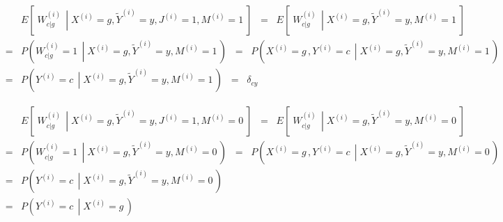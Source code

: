 \begin{eqnarray*}
&&
	E\!\left[\;\left.W^{(i)}_{c \vert g}\,\;\right\vert\;X^{(i)}=g,\widetilde{Y}^{(i)}=y,J^{(i)}=1,M^{(i)}=1\;\right]
\;\;=\;\;
	E\!\left[\;\left.W^{(i)}_{c \vert g}\,\;\right\vert\;X^{(i)}=g,\widetilde{Y}^{(i)}=y,M^{(i)}=1\;\right]
\\
&=&
	P\!\left(\left.W^{(i)}_{c \vert g}=1\,\;\right\vert\;X^{(i)}=g,\widetilde{Y}^{(i)}=y,M^{(i)}=1\,\right)
\;\;=\;\;
	P\!\left(\left.X^{(i)} = g\,,Y^{(i)} = c\,\;\right\vert\;X^{(i)}=g,\widetilde{Y}^{(i)}=y,M^{(i)}=1\,\right)
\\
&=&
	P\!\left(\left.Y^{(i)} = c\,\;\right\vert\;X^{(i)}=g,\widetilde{Y}^{(i)}=y,M^{(i)}=1\,\right)
	\;\; = \;\; \delta_{cy}
\end{eqnarray*}

\begin{eqnarray*}
&&
	E\!\left[\;\left.W^{(i)}_{c \vert g}\,\;\right\vert\;X^{(i)}=g,\widetilde{Y}^{(i)}=y,J^{(i)}=1,M^{(i)}=0\;\right]
\;\;=\;\;
	E\!\left[\;\left.W^{(i)}_{c \vert g}\,\;\right\vert\;X^{(i)}=g,\widetilde{Y}^{(i)}=y,M^{(i)}=0\;\right]
\\
&=&
	P\!\left(\left.W^{(i)}_{c \vert g}=1\,\;\right\vert\;X^{(i)}=g,\widetilde{Y}^{(i)}=y,M^{(i)}=0\,\right)
\;\;=\;\;
	P\!\left(\left.X^{(i)} = g\,,Y^{(i)} = c\,\;\right\vert\;X^{(i)}=g,\widetilde{Y}^{(i)}=y,M^{(i)}=0\,\right)
\\
&=&
	P\!\left(\left.Y^{(i)} = c\,\;\right\vert\;X^{(i)}=g,\widetilde{Y}^{(i)}=y,M^{(i)}=0\,\right)
\\
&=&
	P\!\left(\left.Y^{(i)} = c\,\;\right\vert\;X^{(i)}=g\,\right)
\end{eqnarray*}



\renewcommand{\theenumi}{\roman{enumi}}
\renewcommand{\labelenumi}{\textnormal{(\theenumi)}$\;\;$}

